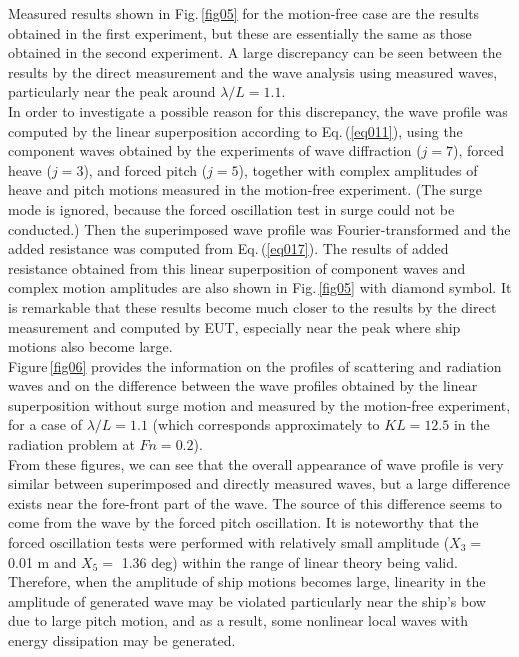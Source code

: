 \documentclass[11pt,fleqn,a3]{article}
\begin{document}
Measured results shown in Fig.\,\ref{fig05} for the motion-free case are 
the results obtained in the first experiment, but these are 
essentially the same as those obtained in the second experiment.
A large discrepancy can be seen between the results by the direct 
measurement and the wave analysis using measured waves, particularly near 
the peak around $\lambda /L =1.1$.
\\

In order to investigate a possible reason for this discrepancy, 
the wave profile was computed by the linear superposition 
according to Eq.\,(\ref{eq011}), using the component waves 
obtained by the experiments of wave diffraction ($j=7$), 
forced heave ($j=3$), and forced pitch ($j=5$), 
together with complex amplitudes of heave and pitch motions 
measured in the motion-free experiment.
(The surge mode is ignored, because the forced oscillation test 
in surge could not be conducted.)
%
Then the superimposed wave profile was Fourier-transformed and the 
added resistance was computed from Eq.\,(\ref{eq017}).
The results of added resistance obtained from this linear superposition 
of component waves and complex motion amplitudes are also 
shown in Fig.\,\ref{fig05} with diamond symbol.
It is remarkable that 
these results become much closer to the results by the direct measurement 
and computed by EUT, especially near the peak where ship motions also 
become large.
\\

Figure\,\ref{fig06} provides the information on the profiles of scattering and
radiation waves and on the difference between the wave profiles 
obtained by the linear superposition without surge motion and 
measured by the motion-free experiment, 
for a case of $\lambda /L =1.1$ (which corresponds 
approximately to $KL=12.5$ in the radiation problem at $Fn=0.2$).
\\

From these figures, we can see that 
the overall appearance of wave profile is very similar between 
superimposed and directly measured waves, but a large difference exists 
near the fore-front part of the wave.
The source of this difference seems to come from the wave by the forced 
pitch oscillation. It is noteworthy that the forced oscillation tests were 
performed with relatively small amplitude ($X_3 =$ 0.01 m and $X_5=$ 1.36 deg) 
within the range of linear theory being valid.
Therefore, when the amplitude of ship motions becomes large,
linearity in the amplitude of generated wave 
may be violated particularly near the ship's bow due to 
large pitch motion, and as a result, some nonlinear local waves 
with energy dissipation may be generated.
\\
\end{document}
